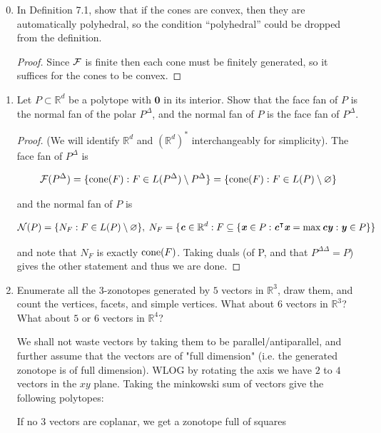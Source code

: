 \documentclass{article}
\begin{document}
\begin{enumerate}
\setcounter{enumi}{-1}
\renewcommand{\labelenumi}{7.\arabic{enumi}}
\item In Definition 7.1, show that if the cones are convex, then they are automatically polyhedral, so the condition ``polyhedral'' could be dropped from the definition.

\begin{proof}
     Since $\mathcal{F}$ is finite then each cone must be finitely generated, so it suffices for the cones to be convex.
\end{proof}

\item Let $P \subset \mathbb{R}^d$ be a polytope with $\mathbf{0}$ in its interior. Show that the face fan of $P$ is the normal fan of the polar $P^\Delta$, and the normal fan of $P$ is the face fan of $P^\Delta$.

\begin{proof}
(We will identify $\mathbb{R}^d$ and $(\mathbb{R}^d)^*$ interchangeably for simplicity). 
The face fan of $P^\Delta$ is 

\[\mathcal{F}(P^\Delta) = \{\operatorname{cone}(F): F \in L(P^\Delta)\setminus P^\Delta\} = \{\operatorname{cone}(F): F \in L(P) \setminus \varnothing\}\]

and the normal fan of $P$ is 

\[\mathcal{N}(P) = \{N_F : F \in L(P)\setminus \varnothing\}, \;N_F = \{\textbf{\textit{c}} \in \mathbb{R}^d: F\subseteq \{\textbf{\textit{x}} \in P: \textbf{\textit{c}}^\intercal \textbf{\textit{x}} = \max \textbf{\textit{cy}}: \textbf{\textit{y}} \in P\}\}\]

and note that $N_F$ is exactly $\operatorname{cone}(F)$. Taking duals (of P, and that $P^{\Delta\Delta} = P$) gives the other statement and thus we are done. 
\end{proof}

\item Enumerate all the $3$-zonotopes generated by $5$ vectors in $\mathbb{R}^3$, draw them, and count the vertices, facets, and simple vertices. What about $6$ vectors in $\mathbb{R}^3$? What about $5$ or $6$ vectors in $\mathbb{R}^4$?

\begin{solution}
We shall not waste vectors by taking them to be parallel/antiparallel, and further assume that the vectors are of "full dimension" (i.e. the generated zonotope is of full dimension). WLOG by rotating the axis we have $2$ to $4$ vectors in the $xy$ plane. Taking the minkowski sum of vectors give the following polytopes:

If no $3$ vectors are coplanar, we get a zonotope full of squares


\end{solution}
\end{enumerate}
\end{document}
